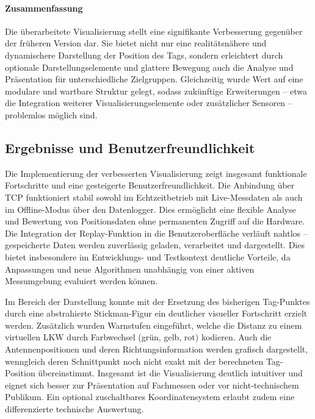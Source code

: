 \documentclass[a4paper, 12pt]{article} %
\begin{document}
\paragraph{Zusammenfassung}

Die überarbeitete Visualisierung stellt eine signifikante Verbesserung gegenüber der früheren Version dar. Sie bietet nicht nur eine realitätsnähere 
und dynamischere Darstellung der Position des Tags, sondern erleichtert durch optionale Darstellungselemente und glattere Bewegung auch die Analyse und 
Präsentation für unterschiedliche Zielgruppen. Gleichzeitig wurde Wert auf eine modulare und wartbare Struktur gelegt, sodass zukünftige 
Erweiterungen – etwa die Integration weiterer Visualisierungselemente oder zusätzlicher Sensoren – problemlos möglich sind.

\subsection{Ergebnisse und Benutzerfreundlichkeit}

Die Implementierung der verbesserten Visualisierung zeigt insgesamt funktionale Fortschritte und eine gesteigerte Benutzerfreundlichkeit. Die Anbindung 
über TCP funktioniert stabil sowohl im Echtzeitbetrieb mit Live-Messdaten als auch im Offline-Modus über den Datenlogger. Dies ermöglicht eine flexible 
Analyse und Bewertung von Positionsdaten ohne permanenten Zugriff auf die Hardware. Die Integration der Replay-Funktion in die Benutzeroberfläche verläuft
 nahtlos – gespeicherte Daten werden zuverlässig geladen, verarbeitet und dargestellt. Dies bietet insbesondere im Entwicklungs- und Testkontext deutliche
  Vorteile, da Anpassungen und neue Algorithmen unabhängig von einer aktiven Messumgebung evaluiert werden können.

Im Bereich der Darstellung konnte mit der Ersetzung des bisherigen Tag-Punktes durch eine abstrahierte Stickman-Figur ein deutlicher visueller 
Fortschritt erzielt werden. Zusätzlich wurden Warnstufen eingeführt, welche die Distanz zu einem virtuellen LKW durch Farbwechsel (grün, gelb, rot) 
kodieren. Auch die Antennenpositionen und deren Richtungsinformation werden grafisch dargestellt, wenngleich deren Schnittpunkt noch nicht exakt mit der 
berechneten Tag-Position übereinstimmt. Insgesamt ist die Visualisierung deutlich intuitiver und eignet sich besser zur Präsentation auf Fachmessen oder
 vor nicht-technischem Publikum. Ein optional zuschaltbares Koordinatensystem erlaubt zudem eine differenzierte technische Auswertung.
\end{document}
